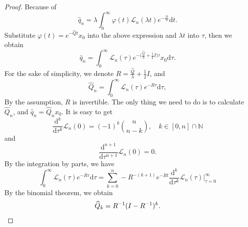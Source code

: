 \documentclass[10pt,a4paper]{amsart}
\newcommand{\LaP}{{\mathscr{L}}}
\newcommand{\mathd}{\mathrm{d}}
\begin{document}
\begin{proof}
	Because of
	\[ \widehat{q }_n = \lambda \int^{\infty}_0 \varphi (t) \LaP_n (\lambda t)
	{e^{- \frac{\lambda t}{2}}}  \mathd t. \]
	Substitute $\varphi(t)=e^{-\widehat{Q}t}x_0$ into the above expression and $\lambda t$ into
	$\tau$, then we obtain
	\[ \widehat{q }_n = \int^{\infty}_0 \LaP_n (\tau) {e^{- \bigl(
			\frac{\hat{Q}}{\lambda} + \frac{1}{2} I \bigr) \tau}}  x_0 \mathd \tau .
	\]
	For the sake of simplicity, we denote $R = \frac{\hat{Q}}{\lambda} +
	\frac{1}{2} I$, and
	\[ \widehat{Q }_n = \int^{\infty}_0 \LaP_n (\tau) {e^{- R \tau}}  \mathd \tau,
	\]
	By the assumption, $R$ is invertible. The only thing we need to do is to
	calculate $\widehat{Q }_n$, and $\widehat{q }_n = \widehat{Q }_n x_0$. It is
	easy to get
	\[ \frac{\mathd^k}{\mathd \tau^k } \LaP_n (0) = (- 1)^k \binom{n}{n-k}, \quad k \in [0, n] \cap \mathbb{N} \]
	and
	\[ \frac{\mathd^{n + 1}}{\mathd \tau^{n + 1} } \LaP_n (0) = 0. \]
	By the integration by parts, we have
	\[ \int^{\infty}_0 \LaP_n (\tau) {e^{- R \tau}}  \mathd \tau = \sum_{k = 0}^n -
	R^{- (k + 1)} e^{- R t}  \frac{\mathd^k}{\mathd
		\tau^k } \LaP_n (\tau) \Big|_{\tau = 0}^{\infty}
	\]
	By the binomial theorem, we obtain
	\[ \widehat{Q}_k = R^{- 1} (I - R^{- 1})^k. \qedhere \] 
\end{proof}
\end{document}

